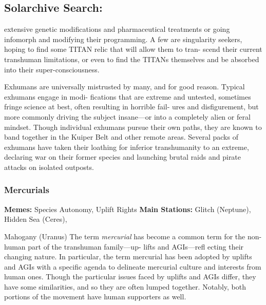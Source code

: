 \subsection{Solarchive Search:   }

extensive genetic modifications and pharmaceutical 
treatments or going infomorph and modifying their 
programming. A few are singularity seekers, hoping 
to find some TITAN relic that will allow them to tran-
scend their current transhuman limitations, or even 
to find the TITANs themselves and be absorbed into 
their super-consciousness.

Exhumans are universally mistrusted by many, and 
for good reason. Typical exhumans engage in modi-
fications that are extreme and untested, sometimes 
fringe science at best, often resulting in horrible fail-
ures and disfigurement, but more commonly driving 
the subject insane—or into a completely alien or feral 
mindset. Though individual exhumans pursue their 
own paths, they are known to band together in the 
Kuiper Belt and other remote areas. Several packs 
of exhumans have taken their loathing for inferior 
transhumanity to an extreme, declaring war on their 
former species and launching brutal raids and pirate 
attacks on isolated outposts.

\subsubsection{Mercurials}

\textbf{Memes:} Species Autonomy, Uplift Rights
\textbf{Main Stations:} Glitch (Neptune), Hidden Sea (Ceres), 

Mahogany (Uranus)
The term \textit{mercurial} has become a common term for 
the non-human part of the transhuman family—up-
lifts and AGIs—refl ecting their changing nature. In 
particular, the term mercurial has been adopted by 
uplifts and AGIs with a specific agenda to delineate 
mercurial culture and interests from human ones. 
Though the particular issues faced by uplifts and 
AGIs differ, they have some similarities, and so they 
are often lumped together. Notably, both portions of 
the movement have human supporters as well.

